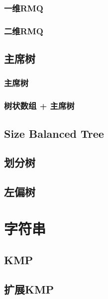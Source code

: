 \documentclass[a4paper, 12pt]{article}
\begin{document}
\subsubsection{一维RMQ}

\subsubsection{二维RMQ}


\subsection{主席树}
\subsubsection{主席树}

\subsubsection{树状数组 + 主席树}


\subsection{Size Balanced Tree}


\subsection{划分树}


\subsection{左偏树}


\section{字符串}
\subsection{KMP}


\subsection{扩展KMP}

\end{document}
